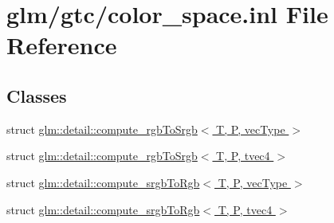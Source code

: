 \hypertarget{gtc_2color__space_8inl}{\section{glm/gtc/color\-\_\-space.inl File Reference}
\label{gtc_2color__space_8inl}
}
\subsection*{Classes}
\begin{DoxyCompactItemize}
\item 
struct \hyperlink{structglm_1_1detail_1_1compute__rgbToSrgb}{glm\-::detail\-::compute\-\_\-rgb\-To\-Srgb$<$ T, P, vec\-Type $>$}
\item 
struct \hyperlink{structglm_1_1detail_1_1compute__rgbToSrgb_3_01T_00_01P_00_01tvec4_01_4}{glm\-::detail\-::compute\-\_\-rgb\-To\-Srgb$<$ T, P, tvec4 $>$}
\item 
struct \hyperlink{structglm_1_1detail_1_1compute__srgbToRgb}{glm\-::detail\-::compute\-\_\-srgb\-To\-Rgb$<$ T, P, vec\-Type $>$}
\item 
struct \hyperlink{structglm_1_1detail_1_1compute__srgbToRgb_3_01T_00_01P_00_01tvec4_01_4}{glm\-::detail\-::compute\-\_\-srgb\-To\-Rgb$<$ T, P, tvec4 $>$}
\end{DoxyCompactItemize}
